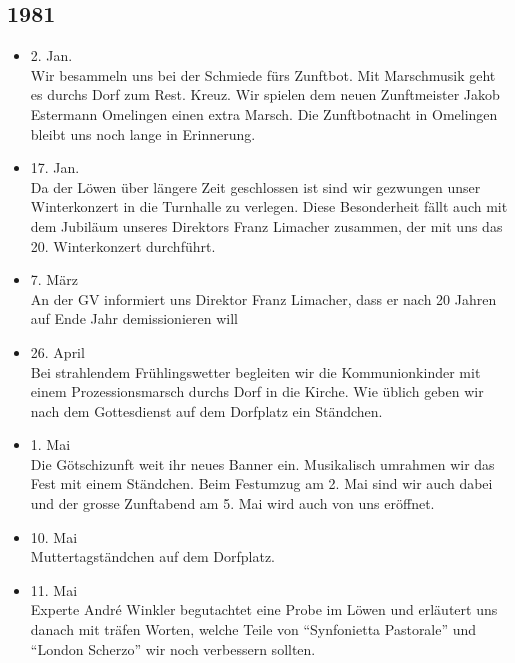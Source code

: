 \subsection{1981}

\begin{history}


    \begin{itemize}

        \item 2. Jan.\\
              Wir besammeln uns bei der Schmiede fürs Zunftbot. Mit Marschmusik geht
              es durchs Dorf zum Rest. Kreuz. Wir spielen dem neuen Zunftmeister Jakob
              Estermann Omelingen einen extra Marsch. Die Zunftbotnacht in Omelingen
              bleibt uns noch lange in Erinnerung.

        \item 17. Jan.\\
              Da der Löwen über längere Zeit geschlossen ist sind wir gezwungen unser
              Winterkonzert in die Turnhalle zu verlegen. Diese Besonderheit fällt
              auch mit dem Jubiläum unseres Direktors Franz Limacher zusammen, der mit
              uns das 20. Winterkonzert durchführt.

        \item 7. März\\
              An der GV informiert uns Direktor Franz Limacher, dass er nach 20 Jahren
              auf Ende Jahr demissionieren will

        \item 26. April\\
              Bei strahlendem Frühlingswetter begleiten wir die Kommunionkinder mit
              einem Prozessionsmarsch durchs Dorf in die Kirche. Wie üblich geben wir
              nach dem Gottesdienst auf dem Dorfplatz ein Ständchen.

        \item 1. Mai\\
              Die Götschizunft weit ihr neues Banner ein. Musikalisch umrahmen wir das
              Fest mit einem Ständchen. Beim Festumzug am 2. Mai sind wir auch dabei
              und der grosse Zunftabend am 5. Mai wird auch von uns eröffnet.

        \item 10. Mai\\
              Muttertagständchen auf dem Dorfplatz.

        \item 11. Mai\\
              Experte André Winkler begutachtet eine Probe im Löwen und erläutert uns
              danach mit träfen Worten, welche Teile von \enquote{Synfonietta Pastorale} und
              \enquote{London Scherzo} wir noch verbessern sollten.


\end{itemize}
\end{history}
